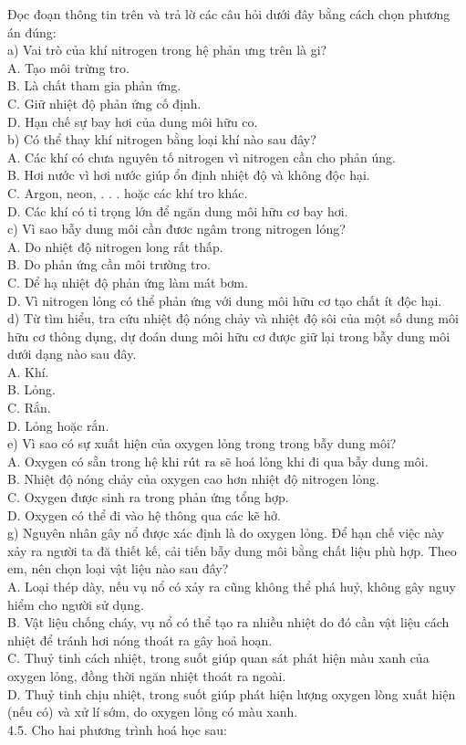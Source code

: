 \documentclass[10pt]{article}
\begin{document}
Đọc đoạn thông tin trên và trả lờ các câu hỏi dưới đây bằng cách chọn phương án đúng:\\
a) Vai trò của khí nitrogen trong hệ phản ưng trên là gi?\\
A. Tạo môi trừng tro.\\
B. Là chất tham gia phản ứng.\\
C. Giữ nhiệt độ phản ứng cố định.\\
D. Hạn chế sự bay hơi của dung môi hữu co.\\
b) Có thể thay khí nitrogen bằng loại khí nào sau đây?\\
A. Các khí có chưa nguyên tố nitrogen vì nitrogen cần cho phản úng.\\
B. Hơi nước vì hơi nước giúp ổn định nhiệt độ và không độc hại.\\
C. Argon, neon, . . . hoặc các khí tro khác.\\
D. Các khí có tỉ trọng lớn để ngăn dung môi hữu cơ bay hơi.\\
c) Vì sao bẫy dung môi cần đươc ngâm trong nitrogen lóng?\\
A. Do nhiệt độ nitrogen long rất thấp.\\
B. Do phản ứng cần môi trường tro.\\
C. Dể hạ nhiệt độ phản ứng làm mát bơm.\\
D. Vì nitrogen lỏng có thể phản ứng với dung môi hữu cơ tạo chất ít độc hại.\\
d) Từ tìm hiểu, tra cứu nhiệt độ nóng chảy và nhiệt độ sôi của một số dung môi hữu cơ thông dụng, dự đoán dung môi hữu cơ được giữ lại trong bẫy dung môi dưới dạng nào sau đây.\\
A. Khí.\\
B. Lỏng.\\
C. Rắn.\\
D. Lỏng hoặc rắn.\\
e) Vì sao có sự xuất hiện của oxygen lỏng trong trong bẫy dung môi?\\
A. Oxygen có sẵn trong hệ khi rút ra sẽ hoá lỏng khi đi qua bẫy dung môi.\\
B. Nhiệt độ nóng chảy của oxygen cao hơn nhiệt độ nitrogen lỏng.\\
C. Oxygen được sinh ra trong phản ứng tổng hợp.\\
D. Oxygen có thể đi vào hệ thông qua các kẽ hở.\\
g) Nguyên nhân gây nổ được xác định là do oxygen lỏng. Để hạn chế việc này xảy ra người ta đă thiết kế, cải tiến bẫy dung môi bằng chất liệu phù hợp. Theo em, nên chọn loại vật liệu nào sau đây?\\
A. Loại thép dày, nếu vụ nổ có xảy ra cũng không thể phá huỷ, không gây nguy hiểm cho người sử dụng.\\
B. Vật liệu chống cháy, vụ nổ có thể tạo ra nhiều nhiệt do đó cần vật liệu cách nhiệt để tránh hơi nóng thoát ra gây hoả hoạn.\\
C. Thuỷ tinh cách nhiệt, trong suốt giúp quan sát phát hiện màu xanh của oxygen lỏng, đồng thời ngăn nhiệt thoát ra ngoài.\\
D. Thuỷ tinh chịu nhiệt, trong suốt giúp phát hiện lượng oxygen lòng xuất hiện (nếu có) và xử lí sớm, do oxygen lỏng có màu xanh.\\
4.5. Cho hai phương trình hoá học sau:
\end{document}
